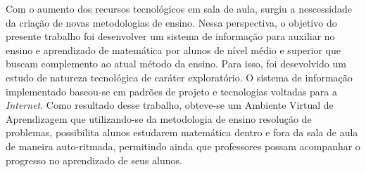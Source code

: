 Com o aumento dos recursos tecnológicos em sala de aula, surgiu a nescessidade da criação de novas metodologias de ensino. Nessa perspectiva, o objetivo do presente trabalho foi desenvolver um sistema de informação para auxiliar no ensino e aprendizado de matemática por alunos de nível médio e superior que buscam complemento ao atual método da ensino. Para isso, foi desevolvido um estudo de natureza tecnológica de caráter exploratório. O sistema de informação implementado baseou-se em padrões de projeto e tecnologias voltadas para a \textit{Internet}. Como resultado desse trabalho, obteve-se um Ambiente Virtual de Aprendizagem que utilizando-se da metodologia de ensino resolução de problemas, possibilita alunos estudarem matemática dentro e fora da sala de aula de maneira auto-ritmada, permitindo ainda que professores possam acompanhar o progresso no aprendizado de seus alunos.   


